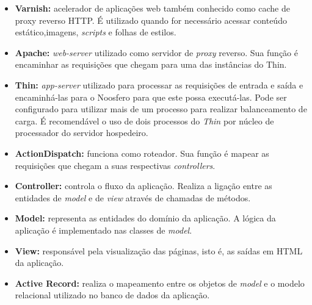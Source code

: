 \begin{itemize}
	\item \textbf{Varnish:} acelerador de aplicações web também conhecido 
	como cache de proxy reverso HTTP. É utilizado quando for necessário
	acessar conteúdo estático,imagens, \textit{scripts} e folhas de estilos.

	\item \textbf{Apache:} \textit{web-server} utilizado como servidor de 
	\textit{proxy} reverso. Sua função é encaminhar as requisições que
	chegam para uma das instâncias do Thin.

	\item \textbf{Thin:} \textit{app-server} utilizado para processar as
	requisições de entrada e saída e encaminhá-las para o Noosfero para que
	este possa executá-las. Pode ser configurado para utilizar mais de um
	processo para realizar balanceamento de carga. É recomendável o uso de
	dois processos do \textit{Thin} por núcleo de processador do servidor
	hospedeiro.
	
	\item \textbf{ActionDispatch:} funciona como roteador. Sua função é
	mapear as requisições que chegam a suas respectivas \textit{controllers}.
	
	\item \textbf{Controller:} controla o fluxo da aplicação. Realiza a
	ligação entre as entidades de \textit{model} e de \textit{view} através
	de chamadas de métodos.
	
	\item \textbf{Model:} representa as entidades do domínio da aplicação.
	A lógica da aplicação é implementado nas classes de \textit{model}.

	\item \textbf{View:} responsável pela visualização das páginas, isto é,
	as saídas em HTML da aplicação.
	
	\item \textbf{Active Record:} realiza o mapeamento entre os objetos de
	\textit{model} e o modelo relacional utilizado no banco de dados da
	aplicação.		
	
\end{itemize}






